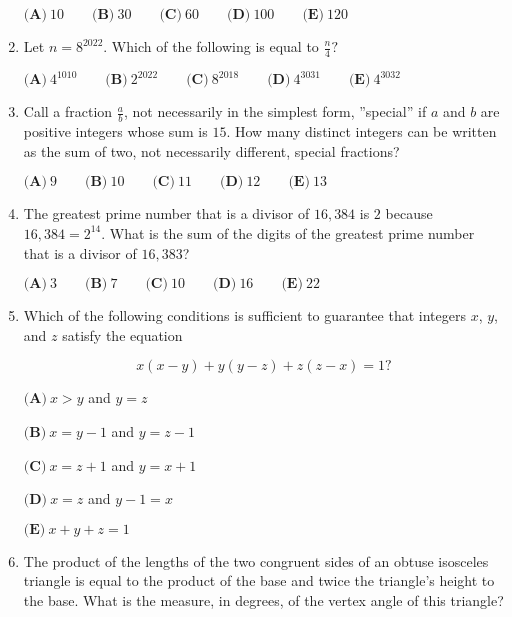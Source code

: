 \documentclass{article}
\begin{document}
\begin{enumerate}[label=\arabic*., itemsep=0.5em]
$\textbf{(A)}\: 10\qquad\textbf{(B)} \: 30\qquad\textbf{(C)} \: 60\qquad\textbf{(D)} \: 100\qquad\textbf{(E)} \: 120$\par \vspace{0.5em}\item Let $n=8^{2022}$. Which of the following is equal to $\frac{n}{4}?$

$\textbf{(A)}\: 4^{1010}\qquad\textbf{(B)} \: 2^{2022}\qquad\textbf{(C)} \: 8^{2018}\qquad\textbf{(D)} \: 4^{3031}\qquad\textbf{(E)} \: 4^{3032}$\par \vspace{0.5em}\item Call a fraction $\frac{a}{b}$, not necessarily in the simplest form, ''special'' if $a$ and $b$ are positive integers whose sum is $15$. How many distinct integers can be written as the sum of two, not necessarily different, special fractions?

$\textbf{(A)}\ 9 \qquad\textbf{(B)}\  10 \qquad\textbf{(C)}\  11 \qquad\textbf{(D)}\ 12 \qquad\textbf{(E)}\ 13$\par \vspace{0.5em}\item The greatest prime number that is a divisor of $16{,}384$ is $2$ because $16{,}384 = 2^{14}$. What is the sum of the digits of the greatest prime number that is a divisor of $16{,}383$?

$\textbf{(A)} \: 3\qquad\textbf{(B)} \: 7\qquad\textbf{(C)} \: 10\qquad\textbf{(D)} \: 16\qquad\textbf{(E)} \: 22$\par \vspace{0.5em}\item Which of the following conditions is sufficient to guarantee that integers $x$, $y$, and $z$ satisfy the equation

\begin{equation*}
x(x-y)+y(y-z)+z(z-x) = 1?
\end{equation*}


$\textbf{(A)} \: x>y$ and $y=z$

$\textbf{(B)} \: x=y-1$ and $y=z-1$

$\textbf{(C)} \: x=z+1$ and $y=x+1$

$\textbf{(D)} \: x=z$ and $y-1=x$

$\textbf{(E)} \: x+y+z=1$\par \vspace{0.5em}\item The product of the lengths of the two congruent sides of an obtuse isosceles triangle is equal to the product of the base and twice the triangle's height to the base. What is the measure, in degrees, of the vertex angle of this triangle?


\end{enumerate}
\end{document}

